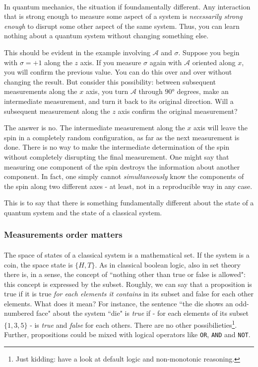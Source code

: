 \documentclass[a4paper,10pt]{article}
\begin{document}
\paragraph{} In quantum mechanics, the situation if foundamentally different. Any interaction that is strong enough to measure some aspect of a system is \textit{necessarily strong enough} to disrupt some other aspect of the same system. Thus, you can learn nothing about a quantum system without changing something else.

This should be evident in the example involving $\mathcal{A}$ and $\sigma$. Suppose you begin with $\sigma = +1$ along the $z$ axis. If you measure $\sigma$ again with $\mathcal{A}$ oriented along $x$, you will confirm the previous value. You can do this over and over without changing the result. But consider this possibility: between subsequent measurements along the $x$ axis, you turn $\mathcal{A}$ through $\ang{90}$ degrees, make an intermediate measurement, and turn it back to its original direction. Will a subsequent measurement along the $z$ axis confirm the original measurement?

The answer is no. The intermediate measurement along the $x$ axis will leave the spin in a completely random configuration, as far as the next measurement is done. There is no way to make the intermediate determination of the spin without completely disrupting the final measurement. One might say that measuring one component of the spin destroys the information about another component. In fact, one simply cannot \textit{simultaneously} know the components of the spin along two different axes - at least, not in a reproducible way in any case.

This is to say that there is something fundamentally different about the state of a quantum system and the state of a classical system.

\subsubsection{Measurements order matters}

\paragraph{} The space of states of a classical system is a mathematical set. If the system is a coin, the space state is $\{H,T\}$. As in classical boolean logic, also in set theory there is, in a sense, the concept of ``nothing other than true or false is allowed": this concept is expressed by the subset. Roughly, we can say that a proposition is true if it is true \textit{for each elements it contains} in its subset and false for each other elements. What does it mean? For instance, the sentence ``the die shows an odd-numbered face" about the system ``die" is \textit{true} if - for each elements of its subset $\{1,3,5\}$ - is \textit{true} and \textit{false} for each others. There are no other possibilieties\footnote{Just kidding: have a look at default logic and non-monotonic reasoning.}. Further, propositions could be mixed with logical operators like \texttt{OR}, \texttt{AND} and \texttt{NOT}.
\end{document}
